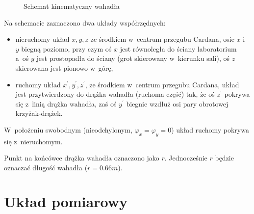\documentclass[paper=a4,DIV=12]{lpas}
\begin{document}
\begin{figure}[htbp]
  \caption{Schemat kinematyczny wahadła}
  \label{fig:7YP7N}
\end{figure}
Na schemacie zaznaczono dwa układy współrzędnych:
\begin{itemize}
  \item nieruchomy układ $x,y,z$ ze środkiem w~centrum przegubu Cardana, osie
        $x$ i~$y$ biegną poziomo, przy czym oś $x$ jest równoległa do ściany
        laboratorium a~oś $y$ jest prostopadła do ściany (grot skierowany
        w~kierunku sali), oś $z$ skierowana jest pionowo w~górę,
  \item ruchomy układ $x^{\prime}, y^{\prime}, z^{\prime}$, ze środkiem w~centrum przegubu
        Cardana, układ jest przytwierdzony do drążka wahadła (ruchoma część)
        tak, że oś $z^{\prime}$ pokrywa się z~linią drążka wahadła, zaś oś $y^{\prime}$
        biegnie wzdłuż osi pary obrotowej krzyżak-drążek.
\end{itemize}
W~położeniu swobodnym (nieodchylonym, $\varphi_x = \varphi_y=0$) układ
ruchomy pokrywa się z~nieruchomym.

Punkt na końcówce drążka wahadła oznaczono jako $r$. Jednocześnie
$r$ będzie oznaczać długość wahadła ($r = 0.66m$).


\section{Układ pomiarowy}
\label{sec:Z2CJY}
\end{document}

